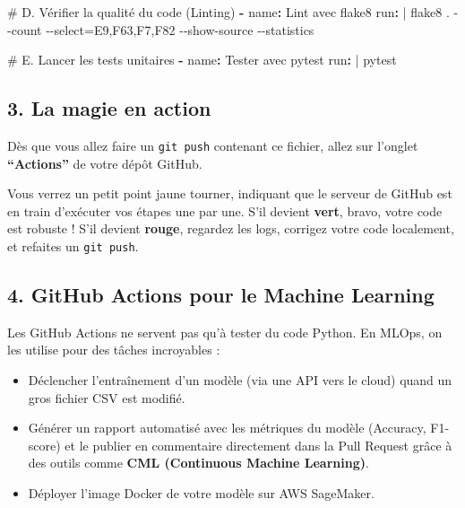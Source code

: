\documentclass[
  letterpaper,
  DIV=11,
  numbers=noendperiod]{scrreprt}
\newenvironment{Shaded}{\begin{snugshade}}{\end{snugshade}}
\newcommand{\AttributeTok}[1]{\textcolor[rgb]{0.40,0.45,0.13}{#1}}
\newcommand{\CharTok}[1]{\textcolor[rgb]{0.13,0.47,0.30}{#1}}
\newcommand{\CommentTok}[1]{\textcolor[rgb]{0.37,0.37,0.37}{#1}}
\newcommand{\FunctionTok}[1]{\textcolor[rgb]{0.28,0.35,0.67}{#1}}
\newcommand{\KeywordTok}[1]{\textcolor[rgb]{0.00,0.23,0.31}{\textbf{#1}}}
\newcommand{\NormalTok}[1]{\textcolor[rgb]{0.00,0.23,0.31}{#1}}
\begin{document}
\begin{Shaded}
\begin{Highlighting}[]
\CommentTok{    \# D. Vérifier la qualité du code (Linting)}
\AttributeTok{    }\KeywordTok{{-}}\AttributeTok{ }\FunctionTok{name}\KeywordTok{:}\AttributeTok{ Lint avec flake8}
\FunctionTok{      run}\KeywordTok{: }\CharTok{|}
\NormalTok{        flake8 . {-}{-}count {-}{-}select=E9,F63,F7,F82 {-}{-}show{-}source {-}{-}statistics}

\CommentTok{    \# E. Lancer les tests unitaires}
\AttributeTok{    }\KeywordTok{{-}}\AttributeTok{ }\FunctionTok{name}\KeywordTok{:}\AttributeTok{ Tester avec pytest}
\FunctionTok{      run}\KeywordTok{: }\CharTok{|}
\NormalTok{        pytest}
\end{Highlighting}
\end{Shaded}

\subsection{3. La magie en action}\label{la-magie-en-action}

Dès que vous allez faire un \texttt{git\ push} contenant ce fichier,
allez sur l'onglet \textbf{``Actions''} de votre dépôt GitHub.

Vous verrez un petit point jaune tourner, indiquant que le serveur de
GitHub est en train d'exécuter vos étapes une par une. S'il devient
\textbf{vert}, bravo, votre code est robuste ! S'il devient
\textbf{rouge}, regardez les logs, corrigez votre code localement, et
refaites un \texttt{git\ push}.

\subsection{4. GitHub Actions pour le Machine
Learning}\label{github-actions-pour-le-machine-learning}

Les GitHub Actions ne servent pas qu'à tester du code Python. En MLOps,
on les utilise pour des tâches incroyables :

\begin{itemize}
\item
  Déclencher l'entraînement d'un modèle (via une API vers le cloud)
  quand un gros fichier CSV est modifié.
\item
  Générer un rapport automatisé avec les métriques du modèle (Accuracy,
  F1-score) et le publier en commentaire directement dans la Pull
  Request grâce à des outils comme \textbf{CML (Continuous Machine
  Learning)}.
\item
  Déployer l'image Docker de votre modèle sur AWS SageMaker.
\end{itemize}
\end{document}
